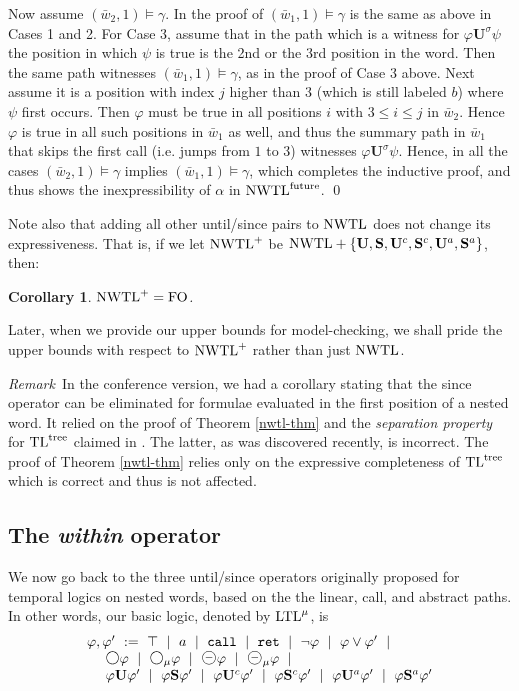 \documentclass{LMCS}
\newcommand{\M}{{\mu}}
\newcommand{\w}{{\bar{w}}}
\newcommand{\dm}{\Diamond}
\newcommand{\U}{{\mathbf U}}
\renewcommand{\S}{{\mathbf S}}
\newcommand{\next}{\text{\raisebox{1pt}{$\bigcirc$}}}
\newcommand{\FO}{{\rm FO}}
\renewcommand{\phi}{\varphi}
\theoremstyle{plain}
\newtheorem{corollary}[theorem]{Corollary}
\theoremstyle{definition}
\newcommand{\ppath}{\sigma} \newcommand{\Ul}{\U}
\newcommand{\Sl}{\S}
\newcommand{\Uc}{\U^c}
\newcommand{\Sc}{\S^c}
\newcommand{\Ur}{\U^a}
\newcommand{\Sr}{\S^a}
\newcommand{\Up}{\U^\ppath}
\newcommand{\prev}{{\text{\Large $\mathbf{\circleddash}$}}}
\newcommand{\retr}{\mathit{ret}}
\newcommand{\ltlv}{\text{\rm LTL}^\M}
\newcommand{\nwtlf}{\nwtl^{\text{\rm future}}}
\newcommand{\nwtlp}{\nwtl^+}
\newcommand{\tltree}{\text{\rm TL}^{\text{\rm tree}}}
\newcommand{\rett}{{\tt ret}}
\newcommand{\call}{{\tt call}}
\renewcommand{\retr}{\rett}
\newcommand{\dmm}{\dm_{\M}}
\newcommand{\dmminus}{\dm^-}
\newcommand{\dmmminus}{\dm_{\M}^-}
\renewcommand{\dm}{\next}
\renewcommand{\dmminus}{\prev}
\renewcommand{\dmm}{\dm_\M}
\renewcommand{\dmmminus}{\dmminus_{\M}}
\begin{document}
\begin{enumerate}[$\bullet$]
Now assume $(\w_2,1)\models\gamma$. In the proof of
$(\w_1,1)\models\gamma$ is the same as above in Cases 1 and 2. For
Case 3, assume that in the path which is a witness for $\phi\Up\psi$
the position in which $\psi$ is true is the 2nd or the 3rd position in
the word. Then the same path witnesses $(\w_1,1)\models\gamma$, as in
the proof of Case 3 above. Next assume it is a position with index $j$
higher than $3$ (which is still labeled $b$) where $\psi$ first
occurs. Then $\phi$ must be true in all positions $i$ with $3 \leq i
\leq j$ in $\w_2$. Hence $\phi$ is true in all such positions in
$\w_1$ as well, and thus the summary path in $\w_1$ that skips the
first call (i.e. jumps from $1$ to $3$) witnesses $\phi\Up\psi$. Hence, in all the cases
$(\w_2,1)\models\gamma$ implies $(\w_1,1)\models\gamma$, which
completes the inductive proof, and thus shows the inexpressibility of
$\alpha$ in $\nwtlf$. 
\qed
\end{enumerate}

\noindent
Note also that adding all other until/since pairs 
to $\text{\rm NWTL}$ does not
change its expressiveness. That is, if we let $\nwtlp$ be 
$\nwtl+\{\Ul, \Sl, \Uc, \Sc, \Ur, \Sr\}$, then:
\begin{corollary}
$\nwtlp=\FO$.
\end{corollary}

Later, when we provide our upper bounds for model-checking,
we shall pride the upper bounds
with respect to $\nwtlp$  rather than just $\text{\rm NWTL}$.

{\em Remark}\ In the conference version, we had a corollary stating
that the since operator can be eliminated for formulae evaluated in
the first position of a nested word. It relied on the proof of Theorem
\ref{nwtl-thm} and the {\em separation property} for $\tltree$ claimed
in \cite{marx-pods04}. The latter, as was discovered recently, is
incorrect. The proof of  Theorem
\ref{nwtl-thm} relies only on the expressive completeness of $\tltree$
which is correct \cite{Schl92,marx-tods} and thus is not affected.




\subsection{The {\em within} operator}
\label{sec-within}
We now go back to the three until/since operators originally proposed
for temporal logics on nested words, based on the the linear, call,
and abstract paths. In other words, our basic logic, denoted by 
$\ltlv$, is 
$$
\begin{array}{l} 
   \phi,\phi' \  :=  \ \top\ \mid\  a \ \mid\ \call\ 
\mid\ \retr\ \mid \ \neg \phi \ \mid \ \phi \vee \phi' \
  \mid \\ 
\ \ \ \  \dm \phi \ \mid \  \dmm \phi \ \mid \ \dmminus \phi \ \mid\
  \dmmminus \phi\ \mid \\
\ \ \ \  \phi \Ul \phi'  \ \mid \   \phi\Sl\phi'\ \mid\
 \phi \Uc \phi'  \ \mid \   \phi\Sc\phi'\ \mid\
 \phi \Ur \phi'  \ \mid \   \phi\Sr\phi'
\end{array}
$$
\end{document}
